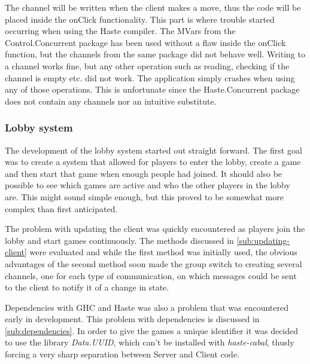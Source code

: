 \documentclass[a4paper]{article}
\begin{document}
The channel will be written when the client makes a move, thus the code will be placed inside the onClick functionality. This part is where trouble started occurring when using the Haste compiler. The MVars from the Control.Concurrent package has been used without a flaw inside the onClick function, but the channels from the same package did not behave well. Writing to a channel works fine, but any other operation such as reading, checking if the channel is empty etc. did not work. The application simply crashes when using any of those operations. This is unfortunate since the Haste.Concurrent package does not contain any channels nor an intuitive substitute.




\subsubsection{Lobby system}
The development of the lobby system started out straight forward. The first goal was to create a system that allowed for players to enter the lobby, create a game and then start that game when enough people had joined. It should also be possible to see which games are active and who the other players in the lobby are. This might sound simple enough, but this proved to be somewhat more complex than first anticipated.

The problem with updating the client was quickly encountered as players join the lobby and start games continuously. The methods discussed in \cref{sub:updating-client} were evaluated and while the first method was initially used, the obvious advantages of the second method soon made the group switch to creating several channels, one for each type of communication, on which messages could be sent to the client to notify it of a change in state.

Dependencies with GHC and Haste was also a problem that was encountered early in development. This problem with dependencies is discussed in \cref{sub:dependencies}. In order to give the games a unique identifier it was decided to use the library \textit{Data.UUID}, which can't be installed with \textit{haste-cabal}, thusly forcing a very sharp separation between Server and Client code.




\end{document}
